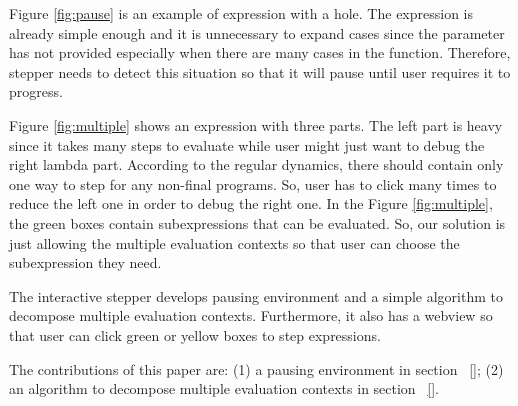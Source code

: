 
Figure \ref{fig:pause} is an example of expression with a hole. The expression is already simple enough and it is unnecessary to expand cases since the parameter has not provided especially when there are many cases in the function. Therefore, stepper needs to detect this situation so that it will pause until user requires it to progress.

Figure \ref{fig:multiple} shows an expression with three parts. The left part is heavy since it takes many steps to evaluate while user might just want to debug the right lambda part. According to the regular dynamics, there should contain only one way to step for any non-final programs. So, user has to click many times to reduce the left one in order to debug the right one. In the Figure \ref{fig:multiple}, the green boxes contain subexpressions that can be evaluated. So, our solution is just allowing the multiple evaluation contexts so that user can choose the subexpression they need.

The interactive stepper develops pausing environment and a simple algorithm to decompose multiple evaluation contexts. Furthermore, it also has a webview so that user can click green or yellow boxes to step expressions. 

 The contributions of this paper are: (1) a pausing environment in section ~\ref{}; (2) an algorithm to decompose multiple evaluation contexts in section ~\ref{}.